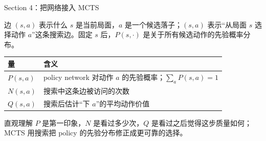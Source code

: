 \documentclass[UTF8,aspectratio=169,10pt]{ctexbeamer}
\begin{document}
\begin{frame}{Section 4：把网络接入 MCTS}
  \small
  \begin{block}{边 $(s,a)$ 表示什么}
    $s$ 是当前局面，$a$ 是一个候选落子；$(s,a)$ 表示“从局面 $s$ 选择动作 $a$”这条搜索边。固定 $s$ 后，$P(s,\cdot)$ 是关于所有候选动作的先验概率分布。
  \end{block}

  \begin{center}
    \begin{tabular}{@{}p{}p{}@{}}
      \toprule
      量 & 含义 \\
      \midrule
      $P(s,a)$ & policy network 对动作 $a$ 的先验概率；$\sum_a P(s,a)=1$ \\
      $N(s,a)$ & 搜索中这条边被访问的次数 \\
      $Q(s,a)$ & 搜索后估计“下 $a$”的平均动作价值 \\
      \bottomrule
    \end{tabular}
  \end{center}

  \begin{alertblock}{直观理解}
    $P$ 是第一印象，$N$ 是看过多少次，$Q$ 是看过之后觉得这步质量如何；MCTS 用搜索把 policy 的先验分布修正成更可靠的选择。
  \end{alertblock}
\end{frame}
\end{document}
